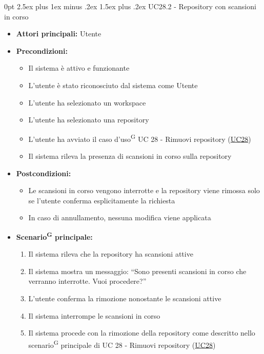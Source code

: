 \documentclass[a4paper, 11pt]{article}
\makeatletter
\renewcommand\paragraph{\@startsection{paragraph}{4}
  {0pt}
  {2.5ex plus 1ex minus .2ex}
  {1.5ex plus .2ex}
  {\normalfont\normalsize\bfseries\color{AccentDark}}}
\makeatother
\begin{document}
\paragraph{UC28.2 - Repository con scansioni in corso} \label{UC28.2}
\begin{itemize}
	\item \textbf{Attori principali:} Utente
	\item \textbf{Precondizioni:} 
	\begin{itemize}
		\item Il sistema è attivo e funzionante
		\item L'utente è stato riconosciuto dal sistema come Utente
		\item L'utente ha selezionato un workspace
		\item L'utente ha selezionato una repository
		\item L'utente ha avviato il caso d'uso\textsuperscript{G} UC 28 - Rimuovi repository (\hyperref[UC28]{UC28})
		\item Il sistema rileva la presenza di scansioni in corso sulla repository
	\end{itemize}
	\item \textbf{Postcondizioni:} 
	\begin{itemize}
		\item Le scansioni in corso vengono interrotte e la repository viene rimossa solo se l'utente conferma esplicitamente la richiesta
		\item In caso di annullamento, nessuna modifica viene applicata
	\end{itemize}
	\item \textbf{Scenario\textsuperscript{G} principale:}
	\begin{enumerate}
		\item Il sistema rileva che la repository ha scansioni attive
		\item Il sistema mostra un messaggio: “Sono presenti scansioni in corso che verranno interrotte. Vuoi procedere?”
		\item L'utente conferma la rimozione nonostante le scansioni attive
		\item Il sistema interrompe le scansioni in corso
		\item Il sistema procede con la rimozione della repository come descritto nello scenario\textsuperscript{G} principale di UC 28 - Rimuovi repository (\hyperref[UC28]{UC28}) 
	\end{enumerate}
\end{itemize}
\end{document}
